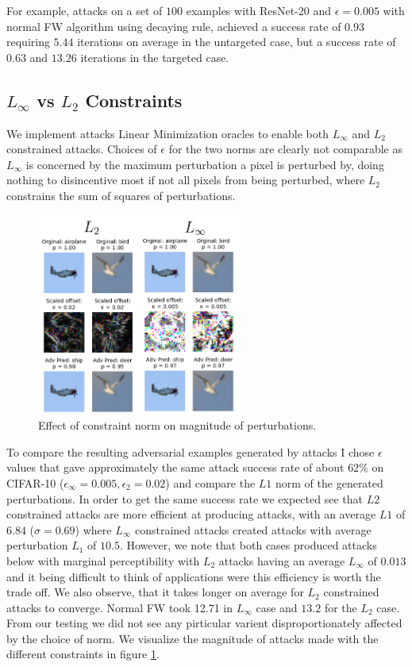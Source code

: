 \documentclass{article}
\begin{document}
For example, attacks on a set of $100$ examples with ResNet-20 and $\epsilon = 0.005$ with normal FW algorithm using decaying rule, achieved a success rate of $0.93$ requiring $5.44$ iterations on average in the untargeted case, but a success rate of $0.63$ and $13.26$ iterations in the targeted case.

\subsection{$L_\infty$ vs $L_2$ Constraints}
We implement attacks Linear Minimization oracles to enable both $L_\infty$ and $L_2$ constrained attacks. 
Choices of $\epsilon$ for the two norms are clearly not comparable as $L_\infty$ is concerned by the maximum perturbation a pixel is perturbed by, doing nothing to disincentive most if not all pixels from being perturbed, where $L_2$ constrains the sum of squares of perturbations. 

\begin{figure}[H]
    \centering
    \includegraphics[width=0.6\textwidth]{plots/norm.png}
    \caption{Effect of constraint norm on magnitude of perturbations.}
    \label{fig:norm}
\end{figure}

To compare the resulting adversarial examples generated by attacks I chose $\epsilon$ values that gave approximately the same attack success rate of about $62\%$ on CIFAR-10 ($\epsilon_\infty = 0.005, \epsilon_2 = 0.02$) and compare the $L1$ norm of the generated perturbations. In order to get the same success rate we expected see that $L2$ constrained attacks are more efficient at producing attacks, with an average $L1$ of $6.84$ ($\sigma = 0.69$) where $L_\infty$ constrained attacks created attacks with average perturbation $L_1$ of $10.5$. However, we note that both cases produced attacks below with marginal perceptibility with $L_2$ attacks having an average $L_\infty$ of $0.013$ and it being difficult to think of applications were this efficiency is worth the trade off.  We also observe, that it takes longer on average for $L_2$ constrained attacks to converge. Normal FW took 12.71 in $L_\infty$ case and $13.2$ for the $L_2$ case. From our testing we did not see any pirticular varient disproportionately affected by the choice of norm.
We visualize the magnitude of attacks made with the different constraints in figure \ref{fig:norm}. 
\end{document}
